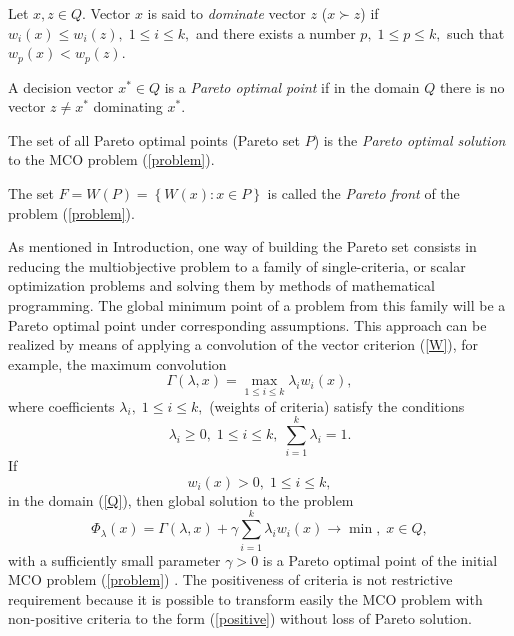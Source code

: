 \documentclass[runningheads]{llncs}
\begin{document}
\begin{definition} 
Let $x,z \in Q$. Vector $x$ is said to \textit{dominate} vector $z$ ($x \succ z$) if $w_i(x) \leq w_i(z), \; 1 \leq i \leq k,$ and there exists a number $p, \; 1 \leq p \leq k,$  such that $w_p(x) < w_p(z)$.
\end{definition}
\begin{definition} 
A decision vector $x^* \in Q$ is a \textit{Pareto optimal point} if in the domain $Q$ there is no vector $z \neq x^*$ dominating $x^*$.
\end{definition}
\begin{definition} 
The set of all Pareto optimal points (Pareto set $P$) is the \textit{Pareto optimal solution} to the MCO problem (\ref{problem}).
\end{definition}
\begin{definition} 
The set $F=W(P)=\left\{W(x):x \in P\right\}$  is called the \textit{Pareto front} of the problem (\ref{problem}).
\end{definition}

As mentioned in Introduction, one way of building the Pareto set consists in reducing the multiobjective problem to a family of single-criteria, or scalar optimization problems and solving them by methods of mathematical programming.  The global minimum point of a problem from this family will be a Pareto optimal point under corresponding assumptions. This approach can be realized by means of applying a convolution of the vector criterion (\ref{W}), for example, the maximum convolution
\begin{equation}\label{conv}
\Gamma(\lambda,x) = \max_{1 \leq i \leq k}{\lambda_i w_i(x)},
\end{equation}
where coefficients $\lambda_i, \; 1 \leq i \leq k,$ (weights of criteria) satisfy the conditions
\begin{equation}\label{lambda}
\lambda_i \geq 0, \; 1 \leq i \leq k, \; \sum_{i=1}^k{\lambda_i} = 1.
\end{equation}
If
\begin{equation}\label{positive}
w_i(x) > 0, \; 1 \leq i \leq k,
\end{equation}
in the domain (\ref{Q}), then global solution to the problem
\begin{equation}\label{conv_problem}
\Phi_\lambda(x) = \Gamma(\lambda,x) + \gamma \sum_{i=1}^k{\lambda_i w_i(x)} \rightarrow \min, \; x \in Q,
\end{equation}
with a sufficiently small parameter $\gamma > 0$ is a Pareto optimal point of the initial MCO problem (\ref{problem}) \cite{Wierzbicki,Marler2004}. The positiveness of criteria is not restrictive requirement because it is possible to transform easily the MCO problem with non-positive criteria to the form (\ref{positive}) without loss of Pareto solution.
\end{document}
